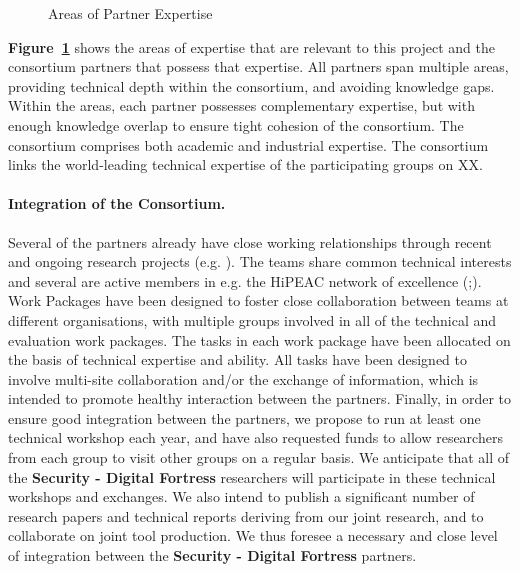 \documentclass[a4paper,11pt]{article}
\newcommand{\project}[1]{\textbf{#1}\xspace}
\newcommand{\SECURITY}{\project{Security - Digital Fortress}}
\newcommand{\TheProject}{\SECURITY}
\begin{document}
\begin{figure}[t]
\begin{center}
\end{center}
\vspace{-0.3in}
\caption{Areas of Partner Expertise}
\label{fig:consortium}
\end{figure}

\textbf{Figure~\ref{fig:consortium}} shows the areas of expertise that
are relevant to this project and the consortium partners that
possess that expertise.  All partners span multiple areas,
providing technical depth within the consortium, and avoiding
knowledge gaps.  Within the areas, each partner possesses
complementary expertise, but with enough knowledge overlap to
ensure tight cohesion of the consortium. The consortium
comprises both academic and industrial expertise.
The consortium links the world-leading technical expertise of
the participating groups on XX.


\paragraph*{Integration of the Consortium.}

Several of the partners already have close working relationships through
recent and ongoing research projects (e.g. \rephrase).
The teams share common technical interests and several are active members in e.g. the
HiPEAC network of excellence (\SAshort{};).
Work Packages have been designed to foster close collaboration
between teams at different organisations, with multiple groups involved in all of
the technical and evaluation work packages. The tasks in 
each work package have been allocated on the basis of
technical expertise and ability. All tasks have been designed to involve multi-site
collaboration and/or the exchange of information, which is
intended to promote healthy interaction between the partners.
Finally, in order to ensure good integration between the partners,
we propose to run at least one technical workshop each year, and
have also requested funds to allow researchers from each group
to visit other groups on a regular basis.  We anticipate that
all of the \TheProject{} researchers will participate in these
technical workshops and exchanges.  We also intend to publish a significant
number of research papers and technical reports deriving from our joint research,
and to collaborate on joint tool production. 
We thus foresee a necessary and close level of integration between
the \TheProject{} partners.
\end{document}
